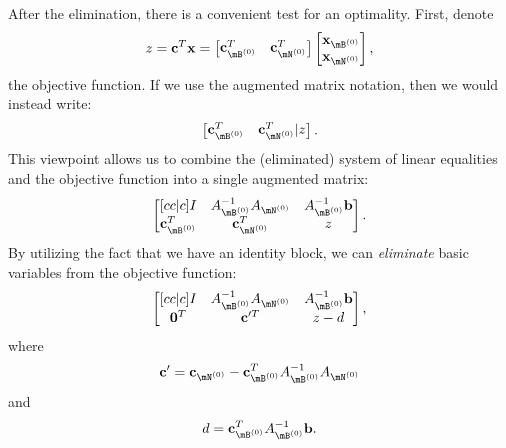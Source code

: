 \documentclass{article}
\renewcommand{\vec}{\mathbf}
\begin{document}
After the elimination, there is a convenient test for an optimality. First, denote
\begin{equation*}
    z = \vec{c}^{T} \vec{x} = \begin{bmatrix} \vec{c}_{\mB^{\left( 0 \right) }}^{T} & \vec{c}_{\mN^{\left( 0 \right) }}^{T} \end{bmatrix} \begin{bmatrix} \vec{x}_{\mB^{\left( 0 \right) }}\\\vec{x}_{\mN^{\left( 0 \right) }} \end{bmatrix} ,
\end{equation*}
the objective function. If we use the augmented matrix notation, then we would instead write:
\begin{equation*}
    \begin{bmatrix} \vec{c}_{\mB^{\left( 0 \right) }}^{T} & \vec{c}_{\mN^{\left( 0 \right) }}^{T} | z \end{bmatrix} .
\end{equation*}
This viewpoint allows us to combine the (eliminated) system of linear equalities and the objective function into a single augmented matrix:
\begin{equation*}
    \begin{bmatrix}[cc|c]
        I & A_{\mB^{\left( 0 \right) }}^{-1} A_{\mN^{\left( 0 \right) }} & A_{\mB^{\left( 0 \right)}}^{-1} \vec{b} \\
        \vec{c}_{\mB^{\left( 0 \right) }}^{T} & \vec{c}_{\mN^{\left( 0 \right) }}^{T} & z \\
    \end{bmatrix} .
\end{equation*}
By utilizing the fact that we have an identity block, we can \textit{eliminate} basic variables from the objective function:
\begin{equation}
    \begin{bmatrix}[cc|c]
        I & A_{\mB^{\left( 0 \right) }}^{-1} A_{\mN^{\left( 0 \right) }} & A_{\mB^{\left( 0 \right)}}^{-1} \vec{b} \\
        \vec{0}^{T} & \vec{c}'^{T}  & z -d \\
    \end{bmatrix} ,
\end{equation}
where
\begin{equation*}
    \vec{c}' = \vec{c}_{\mN^{\left( 0 \right) }}-\vec{c}^{T} _{\mB^{\left( 0 \right) }}A^{-1} _{\mB^{\left( 0 \right) }}A_{\mN^{\left( 0 \right) }}
\end{equation*}
and
\begin{equation*}
    d = \vec{c}_{\mB^{\left( 0 \right) }}^{T} A^{-1} _{\mB^{\left( 0 \right) }}\vec{b}.
\end{equation*}
\end{document}

